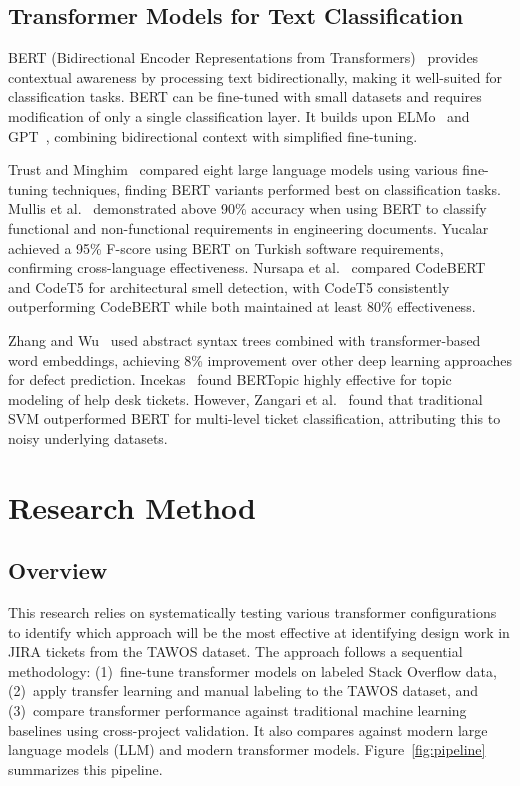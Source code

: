 \documentclass[preprint,12pt]{elsarticle}
\begin{document}
\subsection{Transformer Models for Text Classification}

BERT (Bidirectional Encoder Representations from Transformers)~\cite{devlin2019} provides contextual awareness by processing text bidirectionally, making it well-suited for classification tasks. BERT can be fine-tuned with small datasets and requires modification of only a single classification layer. It builds upon ELMo~\cite{peters2018} and GPT~\cite{radford2018}, combining bidirectional context with simplified fine-tuning.

Trust and Minghim~\cite{trust2024} compared eight large language models using various fine-tuning techniques, finding BERT variants performed best on classification tasks. Mullis et al.~\cite{mullis2023} demonstrated above 90\% accuracy when using BERT to classify functional and non-functional requirements in engineering documents. Yucalar~\cite{yucalar2023} achieved a 95\% F-score using BERT on Turkish software requirements, confirming cross-language effectiveness. Nursapa et al.~\cite{nursapa2025} compared CodeBERT and CodeT5 for architectural smell detection, with CodeT5 consistently outperforming CodeBERT while both maintained at least 80\% effectiveness.

Zhang and Wu~\cite{zhang2020} used abstract syntax trees combined with transformer-based word embeddings, achieving 8\% improvement over other deep learning approaches for defect prediction. Incekas~\cite{incekas2024} found BERTopic highly effective for topic modeling of help desk tickets. However, Zangari et al.~\cite{zangari2023} found that traditional SVM outperformed BERT for multi-level ticket classification, attributing this to noisy underlying datasets.

\section{Research Method}

\subsection{Overview}

This research relies on systematically testing various transformer configurations to identify which approach will be the most effective at identifying design work in JIRA tickets from the TAWOS dataset. The approach follows a sequential methodology: (1)~fine-tune transformer models on labeled Stack Overflow data, (2)~apply transfer learning and manual labeling to the TAWOS dataset, and (3)~compare transformer performance against traditional machine learning baselines using cross-project validation. It also compares against modern large language models (LLM) and modern transformer models. Figure~\ref{fig:pipeline} summarizes this pipeline.
\end{document}
